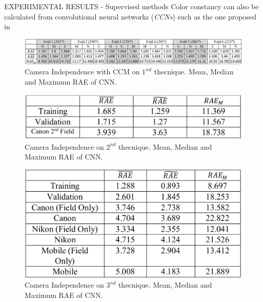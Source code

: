 \begin{frame}{EXPERIMENTAL RESULTS - Supervised methods}
    Color constancy can also be calculated from convolutional neural networks (\emph{CCNs}) such as the one proposed in 
    \begin{figure}[htbp]
        \centering
        \includegraphics[width = 1 \linewidth]{images/paper4/25tech1.png}
        \centering
        \caption{Camera Independence with CCM on $ 1^{nd} $ thecnique. Mean, Median and Maximum RAE of CNN.}
        \label{fig:CNNtec1}
    \end{figure}
    \begin{minipage}{\linewidth}
        \centering
        \begin{minipage}{0.45\linewidth}
            \begin{figure}[H]
                \includegraphics[width=\linewidth]{images/paper4/25tech2.png}
                \caption{\small Camera Independence on $ 2^{nd} $ thecnique. Mean, Median and Maximum RAE of CNN.}\label{fig:1}
            \end{figure}
        \end{minipage}
        \hspace{0.05\linewidth}
        \begin{minipage}{0.45\linewidth}
            \begin{figure}[htbp]
                \centering
                \includegraphics[width=0.8\linewidth]{images/paper4/25tech3.png}
                \caption{\small Camera Independence on $ 3^{nd} $ thecnique. Mean, Median and Maximum RAE of CNN.}\label{fig:1}
                \centering
            \end{figure}
        \end{minipage}
    \end{minipage}
\end{frame}
    
